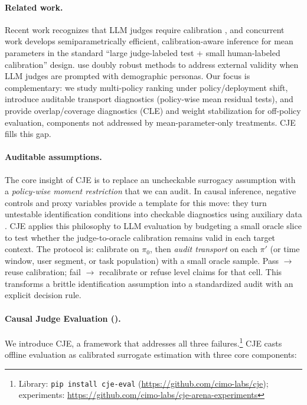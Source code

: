 \paragraph{Related work.}
Recent work recognizes that LLM judges require calibration \citep{Lee2025LLMJudgeReporting}, and concurrent work \citep{Chen2026EfficientLLMJudge} develops semiparametrically efficient, calibration-aware inference for mean parameters in the standard ``large judge-labeled test + small human-labeled calibration'' design. \citet{Guerdan2025DoublyRobustLLM} use doubly robust methods to address external validity when LLM judges are prompted with demographic personas. Our focus is complementary: we study multi-policy ranking under policy/deployment shift, introduce auditable transport diagnostics (policy-wise mean residual tests), and provide overlap/coverage diagnostics (CLE) and weight stabilization for off-policy evaluation, components not addressed by mean-parameter-only treatments. CJE fills this gap.

\paragraph{Auditable assumptions.}
The core insight of CJE is to replace an uncheckable surrogacy assumption with a \emph{policy-wise moment restriction} that we can audit. In causal inference, negative controls and proxy variables provide a template for this move: they turn untestable identification conditions into checkable diagnostics using auxiliary data \citep{Lipsitch2010,TchetgenTchetgen2024}. CJE applies this philosophy to LLM evaluation by budgeting a small oracle slice to test whether the judge-to-oracle calibration remains valid in each target context. The protocol is: calibrate on $\pi_0$, then \emph{audit transport} on each $\pi'$ (or time window, user segment, or task population) with a small oracle sample. Pass $\to$ reuse calibration; fail $\to$ recalibrate or refuse level claims for that cell. This transforms a brittle identification assumption into a standardized audit with an explicit decision rule.

\paragraph{Causal Judge Evaluation (\CJE).}
We introduce CJE, a framework that addresses all three failures.\footnote{Library: \texttt{pip install cje-eval} (\url{https://github.com/cimo-labs/cje}); experiments: \url{https://github.com/cimo-labs/cje-arena-experiments}} CJE casts offline evaluation as calibrated surrogate estimation with three core components:

